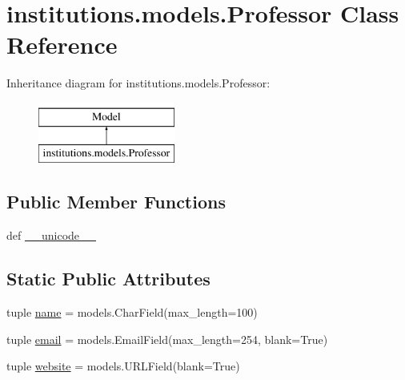 \hypertarget{classinstitutions_1_1models_1_1_professor}{\section{institutions.\-models.\-Professor Class Reference}
\label{classinstitutions_1_1models_1_1_professor}
}
Inheritance diagram for institutions.\-models.\-Professor\-:\begin{figure}[H]
\begin{center}
\leavevmode
\includegraphics[height=2.000000cm]{classinstitutions_1_1models_1_1_professor}
\end{center}
\end{figure}
\subsection*{Public Member Functions}
\begin{DoxyCompactItemize}
\item 
def \hyperlink{classinstitutions_1_1models_1_1_professor_aa758cb37801a9318af810b4c8348ec8f}{\-\_\-\-\_\-unicode\-\_\-\-\_\-}
\end{DoxyCompactItemize}
\subsection*{Static Public Attributes}
\begin{DoxyCompactItemize}
\item 
tuple \hyperlink{classinstitutions_1_1models_1_1_professor_a0f03c8cdf4c8a603a405297c94a59914}{name} = models.\-Char\-Field(max\-\_\-length=100)
\item 
tuple \hyperlink{classinstitutions_1_1models_1_1_professor_a9452e09c5fdc2ad59ff291b6ba884486}{email} = models.\-Email\-Field(max\-\_\-length=254, blank=True)
\item 
tuple \hyperlink{classinstitutions_1_1models_1_1_professor_aedcc93c03e5245d88ac7592721bd4431}{website} = models.\-U\-R\-L\-Field(blank=True)
\end{DoxyCompactItemize}



